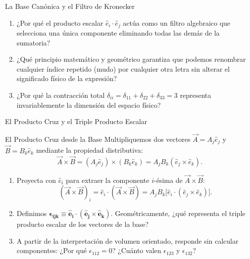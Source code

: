 \documentclass[10pt,aspectratio=169]{beamer}
\begin{document}
\begin{frame}{La Base Canónica y el Filtro de Kronecker}
  \vspace{0.2cm}
  \small
  \begin{enumerate}\itemsep14pt
    \item ¿Por qué el producto escalar $\hat{e}_i \cdot \hat{e}_j$ actúa como un filtro algebraico que selecciona una única componente eliminando todas las demás de la sumatoria?
    \item ¿Qué principio matemático y geométrico garantiza que podemos renombrar cualquier índice repetido (mudo) por cualquier otra letra sin alterar el significado físico de la expresión?
    \item ¿Por qué la contracción total $\delta_{ii} = \delta_{11} + \delta_{22} + \delta_{33} = 3$ representa invariablemente la dimensión del espacio físico?
  \end{enumerate}
\end{frame}

\begin{frame}{El Producto Cruz y el Triple Producto Escalar}
  \begin{block}{El Producto Cruz desde la Base}
    \footnotesize
    Multipliquemos dos vectores $\vec{A} = A_j\hat{e}_j$ y $\vec{B} = B_k\hat{e}_k$ mediante la propiedad distributiva:
    \[
    \vec{A} \times \vec{B} = (A_j\hat{e}_j) \times (B_k\hat{e}_k) = A_j B_k (\hat{e}_j \times \hat{e}_k).
    \]
    \begin{enumerate}
      \itemsep2pt
      \item[(a)] Proyecta con $\hat{e}_i$ para extraer la componente $i$-ésima de $\vec{A}\times\vec{B}$:
      \[
      (\vec{A}\times\vec{B})_i = \hat{e}_i \cdot (\vec{A}\times\vec{B}) = A_j B_k \big[\hat{e}_i \cdot (\hat{e}_j \times \hat{e}_k)\big].
      \]
      \item[(b)] Definimos $\mathbf{\epsilon_{ijk} \equiv \hat{e}_i \cdot (\hat{e}_j \times \hat{e}_k)}$. Geométricamente, ¿qué representa el triple producto escalar de los vectores de la base?
      \item[(c)] A partir de la interpretación de volumen orientado, responde sin calcular componentes: ¿Por qué $\epsilon_{112} = 0$? ¿Cuánto valen $\epsilon_{123}$ y $\epsilon_{132}$?
    \end{enumerate}
  \end{block}
\end{frame}
\end{document}
